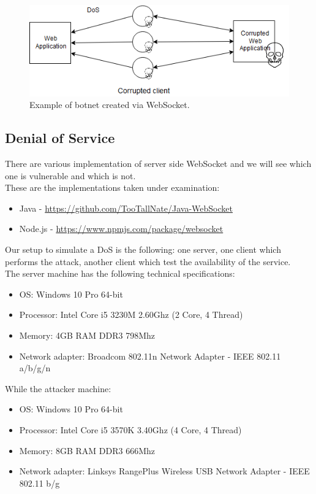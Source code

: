 	\begin{figure}
		\includegraphics[width=\linewidth]{ws-vuln-img0.png}
		\caption{Example of botnet created via WebSocket.}
		\label{fig:ws-vuln0}
	\end{figure}
	
	\subsection{Denial of Service}
	There are various implementation of server side WebSocket and we will see which one is vulnerable and which is not.\\
	These are the implementations taken under examination:
	\begin{itemize}
		\item Java  - \url{https://github.com/TooTallNate/Java-WebSocket}
		\item Node.js - \url{https://www.npmjs.com/package/websocket}
	\end{itemize}

	Our setup to simulate a DoS is the following: one server, one client which performs the attack, another client which test the availability of the service.\\
	The server machine has the following technical specifications:
	\begin{itemize}
		\item OS: Windows 10 Pro 64-bit
		\item Processor: Intel Core i5 3230M 2.60Ghz (2 Core, 4 Thread)
		\item Memory: 4GB RAM DDR3 798Mhz
		\item Network adapter: Broadcom 802.11n Network Adapter - IEEE 802.11 a/b/g/n
	\end{itemize}

	While the attacker machine:
	\begin{itemize}
		\item OS: Windows 10 Pro 64-bit
		\item Processor: Intel Core i5 3570K 3.40Ghz (4 Core, 4 Thread)
		\item Memory: 8GB RAM DDR3 666Mhz
		\item Network adapter: Linksys RangePlus Wireless USB Network Adapter - IEEE 802.11 b/g
	\end{itemize}

